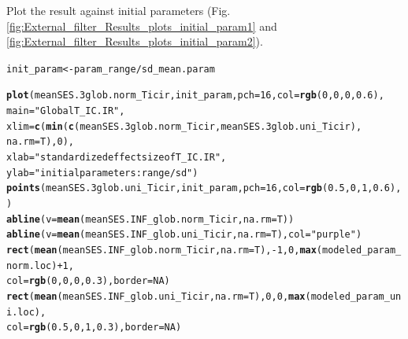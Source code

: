 \documentclass[12pt]{article}\usepackage[]{graphicx}\usepackage[]{color}
\makeatletter
\newcommand{\hlnum}[1]{\textcolor[rgb]{0.686,0.059,0.569}{#1}}%
\newcommand{\hlstr}[1]{\textcolor[rgb]{0.192,0.494,0.8}{#1}}%
\newcommand{\hlopt}[1]{\textcolor[rgb]{0,0,0}{#1}}%
\newcommand{\hlstd}[1]{\textcolor[rgb]{0.345,0.345,0.345}{#1}}%
\newcommand{\hlkwb}[1]{\textcolor[rgb]{0.69,0.353,0.396}{#1}}%
\newcommand{\hlkwc}[1]{\textcolor[rgb]{0.333,0.667,0.333}{#1}}%
\newcommand{\hlkwd}[1]{\textcolor[rgb]{0.737,0.353,0.396}{\textbf{#1}}}%
\newenvironment{kframe}{%
 \def\at@end@of@kframe{}%
 \ifinner\ifhmode%
  \def\at@end@of@kframe{\end{minipage}}%
  \begin{minipage}{\columnwidth}%
 \fi\fi%
 \def\FrameCommand##1{\hskip\@totalleftmargin \hskip-\fboxsep
 \colorbox{shadecolor}{##1}\hskip-\fboxsep
     \hskip-\linewidth \hskip-\@totalleftmargin \hskip\columnwidth}%
 \MakeFramed {\advance\hsize-\width
   \@totalleftmargin\z@ \linewidth\hsize
   \@setminipage}}%
 {\par\unskip\endMakeFramed%
 \at@end@of@kframe}
\newenvironment{knitrout}{}{} %
\makeatother
\begin{document}
Plot the result against initial parameters (Fig. \ref{fig:External_filter_Results_plots_initial_param1} and \ref{fig:External_filter_Results_plots_initial_param2}).
\begin{knitrout}\small
{}\color{fgcolor}\begin{kframe}
\begin{alltt}
\hlstd{init_param} \hlkwb{<-} \hlstd{param_range} \hlopt{/} \hlstd{sd_mean.param}

\hlkwd{plot}\hlstd{(meanSES.3glob.norm_Ticir, init_param,} \hlkwc{pch} \hlstd{=} \hlnum{16}\hlstd{,} \hlkwc{col} \hlstd{=} \hlkwd{rgb}\hlstd{(}\hlnum{0}\hlstd{,} \hlnum{0}\hlstd{,} \hlnum{0}\hlstd{,} \hlnum{0.6}\hlstd{),}
     \hlkwc{main} \hlstd{=} \hlstr{"Global T_IC.IR"}\hlstd{,}
     \hlkwc{xlim} \hlstd{=} \hlkwd{c}\hlstd{(}\hlkwd{min}\hlstd{(}\hlkwd{c}\hlstd{(meanSES.3glob.norm_Ticir, meanSES.3glob.uni_Ticir),}
             \hlkwc{na.rm} \hlstd{= T),} \hlnum{0}\hlstd{),}
     \hlkwc{xlab} \hlstd{=} \hlstr{"standardized effect size of T_IC.IR"}\hlstd{,}
     \hlkwc{ylab} \hlstd{=} \hlstr{"initial parameters: range/sd"}\hlstd{)}
\hlkwd{points}\hlstd{(meanSES.3glob.uni_Ticir, init_param,} \hlkwc{pch} \hlstd{=} \hlnum{16}\hlstd{,} \hlkwc{col} \hlstd{=} \hlkwd{rgb}\hlstd{(}\hlnum{0.5}\hlstd{,} \hlnum{0}\hlstd{,} \hlnum{1}\hlstd{,} \hlnum{0.6}\hlstd{),)}
\hlkwd{abline}\hlstd{(}\hlkwc{v} \hlstd{=} \hlkwd{mean}\hlstd{(meanSES.INF_glob.norm_Ticir,} \hlkwc{na.rm} \hlstd{= T))}
\hlkwd{abline}\hlstd{(}\hlkwc{v} \hlstd{=} \hlkwd{mean}\hlstd{(meanSES.INF_glob.uni_Ticir,} \hlkwc{na.rm} \hlstd{= T),} \hlkwc{col} \hlstd{=} \hlstr{"purple"}\hlstd{)}
\hlkwd{rect}\hlstd{(}\hlkwd{mean}\hlstd{(meanSES.INF_glob.norm_Ticir,} \hlkwc{na.rm} \hlstd{= T),} \hlopt{-}\hlnum{1}\hlstd{,} \hlnum{0}\hlstd{,} \hlkwd{max}\hlstd{(modeled_param_norm.loc)} \hlopt{+} \hlnum{1}\hlstd{,}
     \hlkwc{col} \hlstd{=} \hlkwd{rgb}\hlstd{(}\hlnum{0}\hlstd{,} \hlnum{0}\hlstd{,} \hlnum{0}\hlstd{,} \hlnum{0.3}\hlstd{),} \hlkwc{border} \hlstd{=} \hlnum{NA}\hlstd{)}
\hlkwd{rect}\hlstd{(}\hlkwd{mean}\hlstd{(meanSES.INF_glob.uni_Ticir,} \hlkwc{na.rm} \hlstd{= T),} \hlnum{0}\hlstd{,} \hlnum{0}\hlstd{,} \hlkwd{max}\hlstd{(modeled_param_uni.loc),}
     \hlkwc{col} \hlstd{=} \hlkwd{rgb}\hlstd{(}\hlnum{0.5}\hlstd{,} \hlnum{0}\hlstd{,} \hlnum{1}\hlstd{,} \hlnum{0.3}\hlstd{),} \hlkwc{border} \hlstd{=} \hlnum{NA}\hlstd{)}
\end{alltt}
\end{kframe}\begin{figure}


\end{figure}
\end{knitrout}
\end{document}

